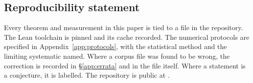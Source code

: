 \subsection{Reproducibility statement}

Every theorem and measurement in this paper is tied to a file in the repository. The Lean
toolchain is pinned and its cache recorded. The numerical protocols are specified in
Appendix~\ref{app:protocols}, with the statistical method and the limiting systematic named.
Where a corpus file was found to be wrong, the correction is recorded in
\S\ref{app:errata} and in the file itself. Where a statement is a conjecture, it is labelled.
The repository is public at .
